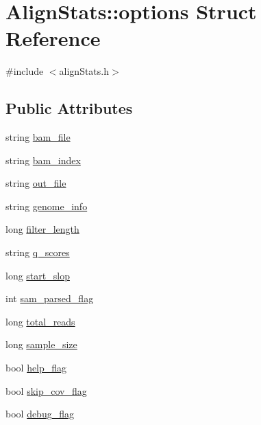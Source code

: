 \hypertarget{struct_align_stats_1_1options}{
\section{AlignStats::options Struct Reference}
\label{struct_align_stats_1_1options}
}


{\ttfamily \#include $<$alignStats.h$>$}

\subsection*{Public Attributes}
\begin{DoxyCompactItemize}
\item 
string \hyperlink{struct_align_stats_1_1options_ad85a9162387d560e42421b81b138de99}{bam\_\-file}
\item 
string \hyperlink{struct_align_stats_1_1options_ac837b3aaf6b013cd76c8b90916e507f7}{bam\_\-index}
\item 
string \hyperlink{struct_align_stats_1_1options_aeccd6951719549cde348e6cd58e43283}{out\_\-file}
\item 
string \hyperlink{struct_align_stats_1_1options_ab115525327af943f92ad59b6e00b7747}{genome\_\-info}
\item 
long \hyperlink{struct_align_stats_1_1options_a533ba263882d33023b63682a5de8aa62}{filter\_\-length}
\item 
string \hyperlink{struct_align_stats_1_1options_af5705e123a1b8dc2fb5414415c6311bb}{q\_\-scores}
\item 
long \hyperlink{struct_align_stats_1_1options_a90fbedd6612bb1635a9a078619d03bdd}{start\_\-slop}
\item 
int \hyperlink{struct_align_stats_1_1options_a37bd731bc14bf63365db2a82122b0609}{sam\_\-parsed\_\-flag}
\item 
long \hyperlink{struct_align_stats_1_1options_a13b8f29a0ad066ba915ee118c21c9b8d}{total\_\-reads}
\item 
long \hyperlink{struct_align_stats_1_1options_ab168ff2db5170e036226d3938e993321}{sample\_\-size}
\item 
bool \hyperlink{struct_align_stats_1_1options_ae9a1d04b390a861656a13bbb9becefcc}{help\_\-flag}
\item 
bool \hyperlink{struct_align_stats_1_1options_a83d2e3d53aacd64b8f2cef6f09ae4d2e}{skip\_\-cov\_\-flag}
\item 
bool \hyperlink{struct_align_stats_1_1options_ab1d57cdf5b105d06aa184d41af5e4505}{debug\_\-flag}

\end{DoxyCompactItemize}
